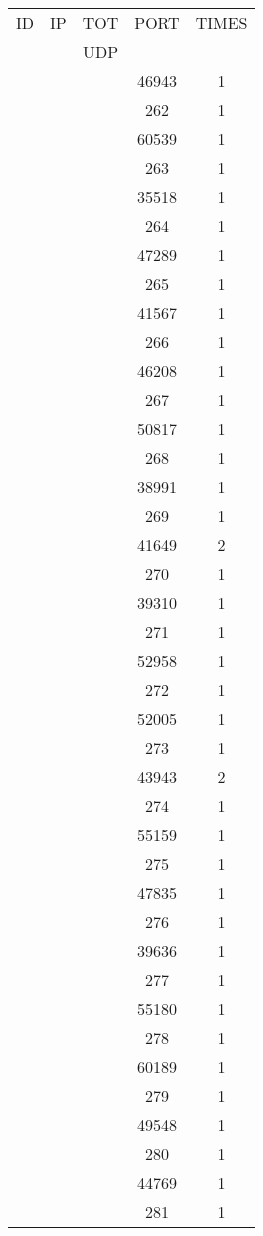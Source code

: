 \documentclass[a4paper]{scrartcl}
\begin{document}
\begin{minipage}[b]{0.5\linewidth}
\begin{tabular}{| c | c | c | c | c |}
\hline
ID & IP & TOT & PORT & TIMES \\ 
   &    & UDP &      &       \\ 
\hline
& & & 46943 & 1 \\ & & & 262 & 1 \\ & & & 60539 & 1 \\ & & & 263 & 1 \\ & & & 35518 & 1 \\ & & & 264 & 1 \\ & & & 47289 & 1 \\ & & & 265 & 1 \\ & & & 41567 & 1 \\ & & & 266 & 1 \\ & & & 46208 & 1 \\ & & & 267 & 1 \\ & & & 50817 & 1 \\ & & & 268 & 1 \\ & & & 38991 & 1 \\ & & & 269 & 1 \\ & & & 41649 & 2 \\ & & & 270 & 1 \\ & & & 39310 & 1 \\ & & & 271 & 1 \\ & & & 52958 & 1 \\ & & & 272 & 1 \\ & & & 52005 & 1 \\ & & & 273 & 1 \\ & & & 43943 & 2 \\ & & & 274 & 1 \\ & & & 55159 & 1 \\ & & & 275 & 1 \\ & & & 47835 & 1 \\ & & & 276 & 1 \\ & & & 39636 & 1 \\ & & & 277 & 1 \\ & & & 55180 & 1 \\ & & & 278 & 1 \\ & & & 60189 & 1 \\ & & & 279 & 1 \\ & & & 49548 & 1 \\ & & & 280 & 1 \\ & & & 44769 & 1 \\ & & & 281 & 1 \\ \hline\end{tabular}\end{minipage} \hfill\begin{minipage}[b]{0.5\linewidth}\begin{tabular}{| c | c | c | c | c |}

\end{tabular}
\end{minipage}
\end{document}
